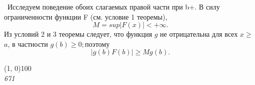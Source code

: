 \documentclass[14pt, a4paper]{extreport}
\begin{document}
    \,\,\,Исследуем поведение обоих слагаемых правой части при {b\to +{\infty}}. В силу ограниченности функции F (см. условие 1 теоремы), 
\begin{equation*}
    M = sup |F(x)| < {+\infty}.
\end{equation*}
Из условий 2 и 3 теоремы следует, что функция $g$ не отрицательна для всех $x$$\ge$$a$, в частности $g(b) \ge$0;\,поэтому
\begin{equation*}
    |g(b)F(b)| \ge Mg(b).
\end{equation*}
\begin{center}
    \line(1, 0){100} \\
    \textit{671}
\end{center}
\end{document}
